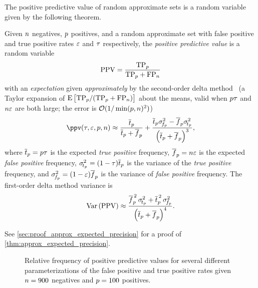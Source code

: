 The positive predictive value of random approximate sets is a random variable given by the following theorem.
\begin{theorem}
	\label{thm:approx_expected_precision}
	Given $n$ negatives, $p$ positives, and a random approximate set with false positive and true positive rates $\varepsilon$ and $\tau$ respectively, the \emph{positive predictive value} is a random variable
	\begin{equation}
	\mathrm{PPV} = \frac{\mathrm{TP}_{p}}{\mathrm{TP}_{p} + \mathrm{FP}_{n}}
	\end{equation}
	with an \emph{expectation} given \emph{approximately} by the second-order delta method~\cite{casellaBerger} (a Taylor expansion of $\Expect{\TP_\p / (\TP_\p + \FP_\n)}$ about the means, valid when $p\tau$ and $n\varepsilon$ are both large; the error is $\mathcal{O}(1/\min(p,n)^2)$)
	\begin{equation}
	\label{eq:approx_expected_precision}
	\ppv(\tprate, \fprate, \p, \n) \approx
	\frac{\overline{t}_\p}{\overline{t}_\p + \overline{f}_\p} +
	\frac{\overline{t}_\p \sigma_{\!f_\p}^2 - \overline{f}_\p
		\sigma_{\!t_\p}^2}{\left(\overline{t}_\p + \overline{f}_\p\right)^3},
	\end{equation}
	where $\overline{t}_p = p \tau$ is the expected \emph{true positive} frequency, $\overline{f}_p =  n \varepsilon$ is the expected \emph{false positive} frequency, $\sigma_{\!t_p}^2 = (1-\tau) \overline{t}_p$ is the variance of the \emph{true positive} frequency, and $\sigma_{\!f_p}^2 = (1-\varepsilon) \overline{f}_p$ is the variance of \emph{false positive} frequency.
	The first-order delta method variance is
	\begin{equation}
	\label{eq:var_ppv}
	\Var{\PPV} \approx
	\frac{\overline{f}_\p^{\,2}\,\sigma_{\!t_\p}^2 +
		\overline{t}_\p^{\,2}\,\sigma_{\!f_\p}^2}
	{\left(\overline{t}_\p + \overline{f}_\p\right)^4}.
	\end{equation}
\end{theorem}
See \cref{sec:proof_approx_expected_precision} for a proof of
\cref{thm:approx_expected_precision}.

\begin{figure}
	\def\svgwidth{\columnwidth/2}
	\centering
	\captionsetup{justification=centering}
	
	\caption{Relative frequency of positive predictive values for several different parameterizations of the false positive and true positive rates given $n = 900$ negatives and $p=100$ positives.}
	\label{fig:prec_vs_fprate_and_fnrate}
\end{figure}

